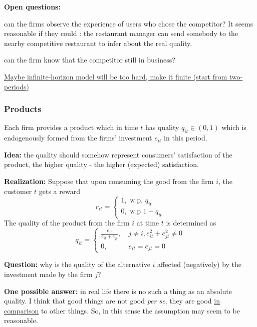 \documentclass[a4paper]{article}
\begin{document}
	
	
	
	\textbf{Open questions:} 
	
	
	
	
	can the firms observe the experience of users who chose the competitor? It seems reasonable if they could : the restaurant manager can send somebody to the nearby competitive restaurant to infer about the real quality.
	
	
	
	can the firm know that the competitor still in business?
	
	
	\underline{Maybe infinite-horizon model will be too hard, make it finite (start from two-periods)}
	
	
	
	
	\subsubsection{Products}
	Each firm provides a product which in time $t$ has quality $q_{it} \in (0, 1)$  which is endogenously formed from the firms' investment $e_{it}$ in this period. 
	
	
	
	
	\textbf{Idea:} the quality should somehow represent consumers' satisfaction of the product, the higher quality - the higher (expected) satisfaction. 
	
	
	
	\textbf{Realization:} Suppose that upon consuming the good from the firm $i$, the customer $t$ gets a reward $$r_{it} = \begin{cases}
	1, \text{ w.p. } q_{it}\\
	0, \text{ w.p } 1 - q_{it}
	\end{cases}$$
    The quality of the product from the firm $i$ at time $t$ is determined as $$q_{it} = \begin{cases} \frac{e_{it}}{e_{it}+e_{jt}},\ &j \neq i, e_{it}^2 + e_{jt}^2 \neq 0 \\
	0, &e_{it} = e_{jt} = 0
	\end{cases}
	$$
	
	

	
	
	\textbf{Question:} why is the quality of the alternative $i$ affected (negatively) by the investment made by the firm $j$?
	
	
	
	
	\textbf{One possible answer:} in real life there is no such a thing as an absolute quality. I think that good things are not good \textit{per se}, they are good \underline{in comparison} to other things. So, in this sense the assumption may seem to be reasonable.
	
\end{document}
